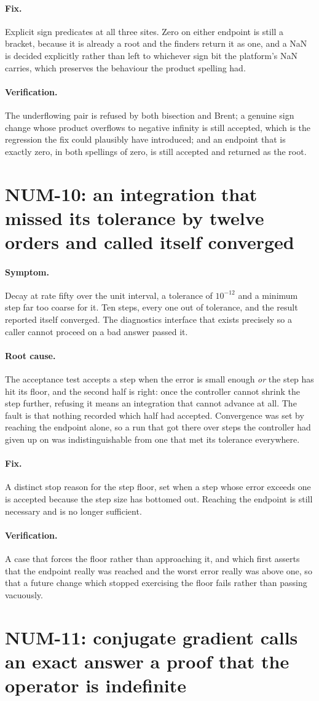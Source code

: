 \documentclass[11pt,a4paper]{report}
\newcommand{\symptom}[1]{\paragraph{Symptom.}#1}
\newcommand{\rootcause}[1]{\paragraph{Root cause.}#1}
\newcommand{\fix}[1]{\paragraph{Fix.}#1}
\newcommand{\verification}[1]{\paragraph{Verification.}#1}
\begin{document}
\fix{Explicit sign predicates at all three sites. Zero on either endpoint is
still a bracket, because it is already a root and the finders return it as one,
and a NaN is decided explicitly rather than left to whichever sign bit the
platform's NaN carries, which preserves the behaviour the product spelling had.}

\verification{The underflowing pair is refused by both bisection and Brent; a
genuine sign change whose product overflows to negative infinity is still
accepted, which is the regression the fix could plausibly have introduced; and an
endpoint that is exactly zero, in both spellings of zero, is still accepted and
returned as the root.}

\section{NUM-10: an integration that missed its tolerance by twelve orders and called itself converged}

\symptom{Decay at rate fifty over the unit interval, a tolerance of $10^{-12}$
and a minimum step far too coarse for it. Ten steps, every one out of tolerance,
and the result reported itself converged. The diagnostics interface that exists
precisely so a caller cannot proceed on a bad answer passed it.}

\rootcause{The acceptance test accepts a step when the error is small enough
\emph{or} the step has hit its floor, and the second half is right: once the
controller cannot shrink the step further, refusing it means an integration that
cannot advance at all. The fault is that nothing recorded which half had
accepted. Convergence was set by reaching the endpoint alone, so a run that got
there over steps the controller had given up on was indistinguishable from one
that met its tolerance everywhere.}

\fix{A distinct stop reason for the step floor, set when a step whose error
exceeds one is accepted because the step size has bottomed out. Reaching the
endpoint is still necessary and is no longer sufficient.}

\verification{A case that forces the floor rather than approaching it, and which
first asserts that the endpoint really was reached and the worst error really was
above one, so that a future change which stopped exercising the floor fails
rather than passing vacuously.}

\section{NUM-11: conjugate gradient calls an exact answer a proof that the operator is indefinite}
\end{document}
